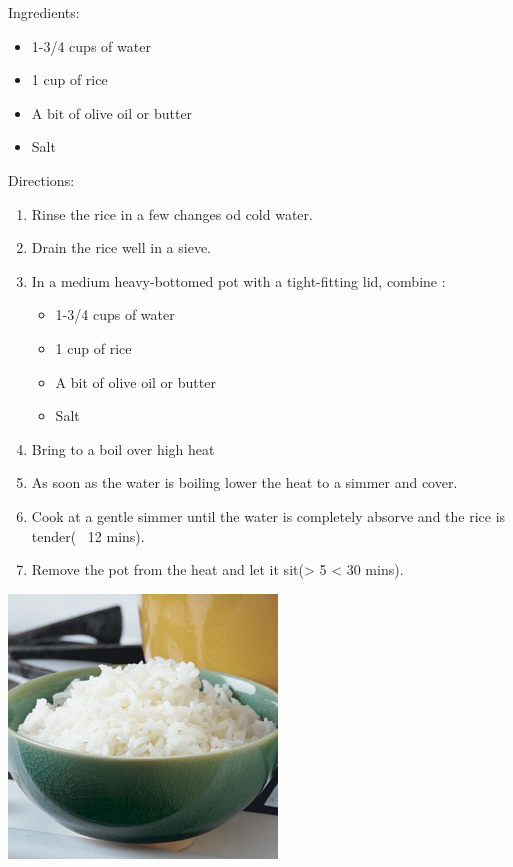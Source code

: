 \documentclass{article}
\begin{document}
%
%
%
%
%

\begin{multicols}{2}
Ingredients:
\begin{itemize}
\item 1-3/4 cups of water
\item 1 cup of rice
\item A bit of olive oil or butter
\item Salt
\end{itemize}
\columnbreak

Directions:
\begin{enumerate}
\item Rinse the rice in a few changes od cold water.

\item Drain the rice well in a sieve.

\item In a medium heavy-bottomed pot with a tight-fitting lid, combine :
\begin{itemize}
\item 1-3/4 cups of water
\item 1 cup of rice
\item A bit of olive oil or butter
\item Salt
\end{itemize}

\item Bring to a boil over high heat

\item As soon as the water is boiling lower the heat to a simmer and cover.

\item Cook at a gentle simmer until the water is completely absorve and the rice is tender(~ 12 mins).

\item Remove the pot from the heat and let it sit(> 5 < 30 mins).
\end{enumerate}




\end{multicols}



\begin{center}
\includegraphics[scale=0.4]{rice.jpg}
\end{center}
\end{document}

